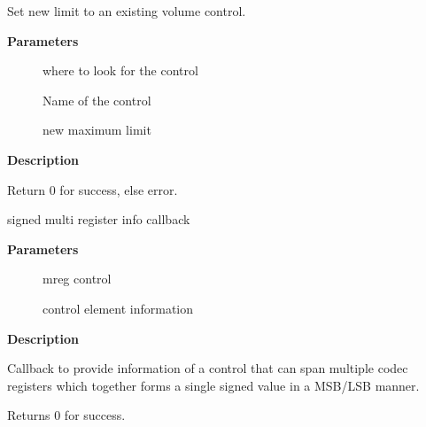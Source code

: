 \documentclass[a4paper,8pt,english]{sphinxmanual}
\begin{document}
\begin{fulllineitems}
\label{sound/kernel-api/alsa-driver-api:c.snd_soc_limit_volume}
Set new limit to an existing volume control.

\end{fulllineitems}


\textbf{Parameters}
\begin{description}
\item[{}] \leavevmode
where to look for the control

\item[{}] \leavevmode
Name of the control

\item[{}] \leavevmode
new maximum limit

\end{description}

\textbf{Description}

Return 0 for success, else error.

\begin{fulllineitems}
\label{sound/kernel-api/alsa-driver-api:c.snd_soc_info_xr_sx}
signed multi register info callback

\end{fulllineitems}


\textbf{Parameters}
\begin{description}
\item[{}] \leavevmode
mreg control

\item[{}] \leavevmode
control element information

\end{description}

\textbf{Description}

Callback to provide information of a control that can
span multiple codec registers which together
forms a single signed value in a MSB/LSB manner.

Returns 0 for success.
\end{document}
